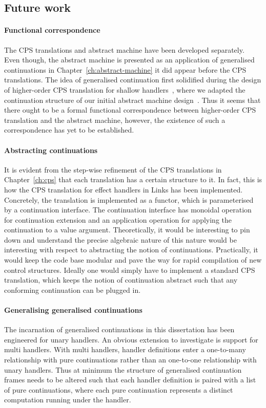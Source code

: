 \documentclass[12pt,phd,lfcs,twoside,openright,logo,leftchapter,normalheadings]{infthesis}
\theoremstyle{plain}
\theoremstyle{definition}
\begin{document}
\subsection{Future work}

\paragraph{Functional correspondence} The CPS translations and
abstract machine have been developed separately. Even though, the
abstract machine is presented as an application of generalised
continuations in Chapter~\ref{ch:abstract-machine} it did appear
before the CPS translations. The idea of generalised continuation
first solidified during the design of higher-order CPS translation for
shallow handlers~\cite{HillerstromL18}, where we adapted the
continuation structure of our initial abstract machine
design~\cite{HillerstromL16}. Thus it seems that there ought to be a
formal functional correspondence between higher-order CPS translation
and the abstract machine, however, the existence of such a
correspondence has yet to be established.

\paragraph{Abstracting continuations} It is evident from the step-wise
refinement of the CPS translations in Chapter~\ref{ch:cps} that each
translation has a certain structure to it.
%
In fact, this is how the CPS translation for effect handlers in Links
has been implemented. Concretely, the translation is implemented as a
functor, which is parameterised by a continuation interface. The
continuation interface has monoidal operation for continuation
extension and an application operation for applying the continuation
to a value argument. Theoretically, it would be interesting to pin
down and understand the precise algebraic nature of this nature would
be interesting with respect to abstracting the notion of
continuations. Practically, it would keep the code base modular and
pave the way for rapid compilation of new control structures. Ideally
one would simply have to implement a standard CPS translation, which
keeps the notion of continuation abstract such that any conforming
continuation can be plugged in.

\paragraph{Generalising generalised continuations} The incarnation of
generalised continuations in this dissertation has been engineered for
unary handlers. An obvious extension to investigate is support for
multi handlers. With multi handlers, handler definitions enter a
one-to-many relationship with pure continuations rather than an
one-to-one relationship with unary handlers. Thus at minimum the
structure of generalised continuation frames needs to be altered such
that each handler definition is paired with a list of pure
continuations, where each pure continuation represents a distinct
computation running under the handler.
\end{document}
